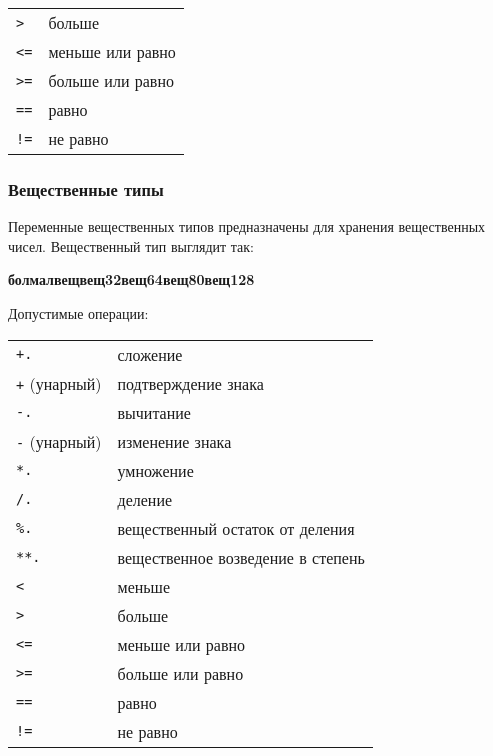 \documentclass[10pt]{report}
\begin{document}
\begin{longtable}{ll}
 	\texttt{>}              & больше                                            \\
 	\texttt{<=}             & меньше или равно                                  \\
 	\texttt{>=}             & больше или равно                                  \\
 	\texttt{==}             & равно                                             \\
 	\texttt{!=}             & не равно                                          \\
\end{longtable}
       
\subsubsection{Вещественные типы}          
Переменные вещественных типов предназначены для хранения вещественных чисел. Вещественный тип выглядит так:
\begin{center}
	\noindent\rbo\textbf{бол}\kleene\sor\textbf{мал}\kleene\rbc\textbf{вещ}\sor\textbf{вещ32}\sor\textbf{вещ64}\sor\textbf{вещ80}\sor\textbf{вещ128}
\end{center}

Допустимые операции:
\begin{longtable}{ll}
	\texttt{+.}             & сложение                                          \\
	\texttt{+} (унарный)    & подтверждение знака                               \\
	\texttt{-.}             & вычитание                                         \\
	\texttt{-} (унарный)    & изменение знака                                   \\
	\texttt{*.}             & умножение                                         \\
	\texttt{/.}             & деление                                           \\
	\texttt{\%.}            & вещественный остаток от деления                   \\
	\texttt{**.}            & вещественное возведение в степень                 \\
	\texttt{<}              & меньше                                            \\
	\texttt{>}              & больше                                            \\
	\texttt{<=}             & меньше или равно                                  \\
	\texttt{>=}             & больше или равно                                  \\
	\texttt{==}             & равно                                             \\
	\texttt{!=}             & не равно                                          \\
\end{longtable}        
\end{document}
